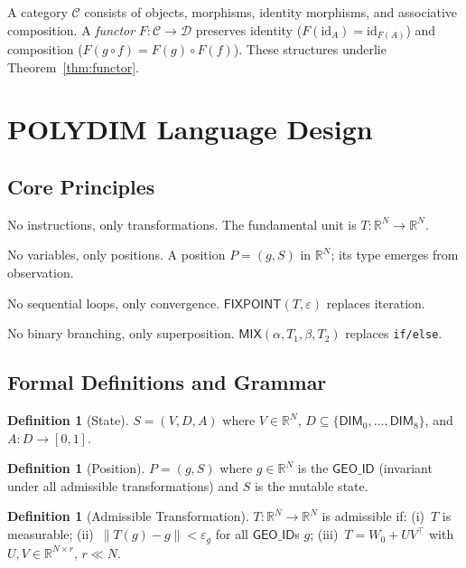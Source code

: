 \documentclass[10pt,twocolumn]{article}
\theoremstyle{plain}
\theoremstyle{definition}
\newtheorem{definition}[theorem]{Definition}
\theoremstyle{remark}
\newcommand{\RR}{\mathbb{R}}
\newcommand{\GeoID}{\mathsf{GEO\_ID}}
\newcommand{\Mix}{\mathsf{MIX}}
\newcommand{\Fixpoint}{\mathsf{FIXPOINT}}
\newcommand{\norm}[1]{\left\|#1\right\|}
\begin{document}
A category $\mathcal{C}$ consists of objects, morphisms, identity morphisms, and
associative composition. A \emph{functor} $F\colon \mathcal{C} \to \mathcal{D}$
preserves identity ($F(\mathrm{id}_A) = \mathrm{id}_{F(A)}$) and composition
($F(g \circ f) = F(g) \circ F(f)$). These structures underlie
Theorem~\ref{thm:functor}.

\section{POLYDIM Language Design}
\label{sec:language}

\subsection{Core Principles}

\begin{description}[leftmargin=1.5em]
\item[P1] No instructions, only transformations. The fundamental unit is
  $T\colon \RR^N \to \RR^N$.
\item[P2] No variables, only positions. A position $P = (g, S)$ in $\RR^N$;
  its type emerges from observation.
\item[P3] No sequential loops, only convergence. $\Fixpoint(T, \varepsilon)$
  replaces iteration.
\item[P4] No binary branching, only superposition. $\Mix(\alpha, T_1, \beta,
  T_2)$ replaces \texttt{if/else}.
\end{description}

\subsection{Formal Definitions and Grammar}
\label{sec:defs}

\begin{definition}[State]
$S = (V, D, A)$ where $V \in \RR^N$, $D \subseteq \{\mathsf{DIM}_0, \ldots,
\mathsf{DIM}_8\}$, and $A\colon D \to [0,1]$.
\end{definition}

\begin{definition}[Position]
$P = (g, S)$ where $g \in \RR^N$ is the $\GeoID$ (invariant under all
admissible transformations) and $S$ is the mutable state.
\end{definition}

\begin{definition}[Admissible Transformation]
$T\colon \RR^N \to \RR^N$ is admissible if: (i)~$T$ is measurable;
(ii)~$\norm{T(g) - g} < \varepsilon_g$ for all $\GeoID$s $g$;
(iii)~$T = W_0 + UV^\top$ with $U, V \in \RR^{N \times r}$, $r \ll N$.
\end{definition}
\end{document}
